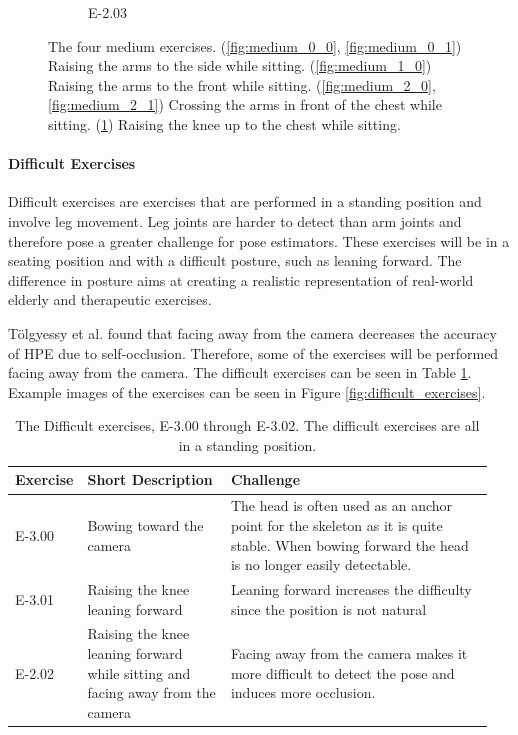 \begin{figure}[htb]
\begin{subfigure}[b]{0.29\linewidth}
        \caption[]{E-2.03}
        \label{fig:medium_3_0}
    \end{subfigure}
    \caption[Medium Exercises]{The four medium exercises. (\ref{fig:medium_0_0}, \ref{fig:medium_0_1}) Raising the arms to the side while sitting. (\ref{fig:medium_1_0}) Raising the arms to the front while sitting. (\ref{fig:medium_2_0}, \ref{fig:medium_2_1}) Crossing the arms in front of the chest while sitting. (\ref{fig:medium_3_0}) Raising the knee up to the chest while sitting.}
    \label{fig:medium_exercises}
  \end{figure}  

\paragraph{Difficult Exercises}

Difficult exercises are exercises that are performed in a standing position and involve leg movement. Leg joints are harder to detect than arm joints and therefore pose a greater challenge for pose estimators. These exercises will be in a seating position and with a difficult posture, such as leaning forward. The difference in posture aims at creating a realistic representation of real-world elderly and therapeutic exercises.

Tölgyessy et al.\cite{HPEIsHard} found that facing away from the camera decreases the accuracy of HPE due to self-occlusion. Therefore, some of the exercises will be performed facing away from the camera. The difficult exercises can be seen in Table \ref{tab:difficult_exercises}. Example images of the exercises can be seen in Figure \ref{fig:difficult_exercises}.

\begin{table}[htb]
  \caption[Difficult Exercises]{The Difficult exercises, E-3.00 through E-3.02. The difficult exercises are all in a standing position.}
  \label{tab:difficult_exercises}
  \begin{tabular}{p{0.1\linewidth}p{0.3\linewidth}p{0.55\linewidth}}
  \hline
  \textbf{Exercise}& \textbf{Short Description}                                                              & \textbf{Challenge} \\ \hline
  E-3.00   & Bowing toward the camera                                                       & The head is often used as an anchor point for the skeleton as it is quite stable. When bowing forward the head is no longer easily detectable. \\
  E-3.01   & Raising the knee leaning forward                                               & Leaning forward increases the difficulty since the position is not natural \\
  E-2.02   & Raising the knee leaning forward while sitting and facing away from the camera & Facing away from the camera makes it more difficult to detect the pose and induces more occlusion.  \\ \hline
  \end{tabular}
\end{table}

